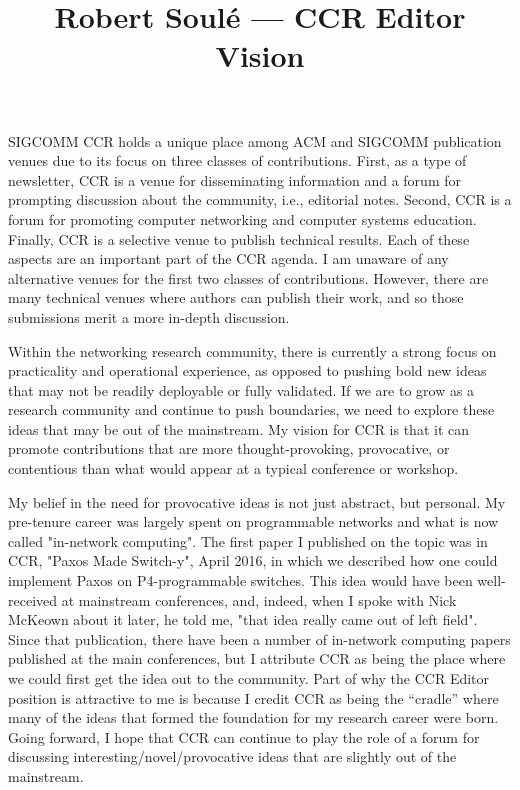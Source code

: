 \documentclass[11pt]{article}
\title{ Robert Soul\'{e} --- CCR Editor Vision}
\author{  }
\date{ }
\begin{document}
\maketitle	
\thispagestyle{empty}

SIGCOMM CCR holds a unique place among ACM and SIGCOMM publication venues due to its focus on three classes of contributions. First, as a type of newsletter, CCR is a venue for disseminating information and a forum for prompting discussion about the community, i.e., editorial notes. Second, CCR is a forum for promoting computer networking and computer systems education. Finally, CCR is a selective venue to publish technical results. Each of these aspects are an important part of the CCR agenda. I am unaware of any alternative venues for the first two classes of contributions. However, there are many technical venues where authors can publish their work, and so those submissions merit a more in-depth discussion.  

Within the networking research community, there is currently a strong focus on practicality and operational experience, as opposed to pushing bold new ideas that may not be readily deployable or fully validated. If we are to grow as a research community and continue to push boundaries, we need to explore these ideas that may be out of the mainstream. My vision for CCR is that it can promote contributions that are more thought-provoking, provocative, or contentious than what would appear at a typical conference or workshop. 

My belief in the need for provocative ideas is not just abstract, but personal. My pre-tenure career was largely spent on programmable networks and what is now called "in-network computing". The first paper I published on the topic was in CCR, "Paxos Made Switch-y", April 2016, in which we described how one could implement Paxos on P4-programmable switches. This idea would have been well-received at mainstream conferences, and, indeed, when I spoke with Nick McKeown about it later, he told me, "that idea really came out of left field". Since that publication, there have been a number of in-network computing papers published at the main conferences, but I attribute CCR as being the place where we could first get the idea out to the community. Part of why the CCR Editor position is attractive to me is because I credit CCR as being the “cradle” where many of the ideas that formed the foundation for my research career were born. Going forward, I hope that CCR can continue to play the role of a forum for discussing interesting/novel/provocative ideas that are slightly out of the mainstream. 
\end{document}
